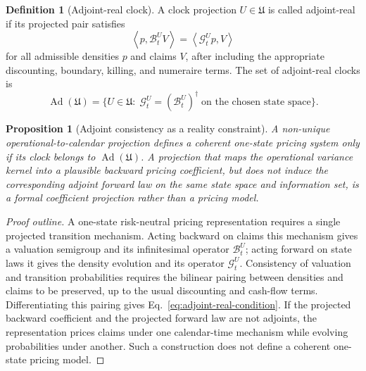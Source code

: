 \documentclass[11pt]{amsart}
\newcommand{\Ad}{\operatorname{Ad}}
\newcommand{\Pair}[2]{\left\langle #1,#2\right\rangle}
\newcommand{\Bop}{\mathcal{B}}
\newcommand{\Gop}{\mathcal{G}}
\theoremstyle{definition}
\newtheorem{definition}{Definition}
\theoremstyle{plain}
\newtheorem{proposition}{Proposition}
\theoremstyle{remark}
\begin{document}
\begin{definition}[Adjoint-real clock]
A clock projection $U\in\mathfrak U$ is called adjoint-real if its projected pair satisfies
\begin{equation}
 \Pair{p}{\Bop_t^U V}=\Pair{\Gop_t^U p}{V}
 \label{eq:adjoint-real-condition}
\end{equation}
for all admissible densities $p$ and claims $V$, after including the appropriate discounting, boundary, killing, and numeraire terms. The set of adjoint-real clocks is
\begin{equation}
 \Ad(\mathfrak U)=\{U\in\mathfrak U:\; \Gop_t^U=(\Bop_t^U)^\dagger\;\text{on the chosen state space}\}.
 \label{eq:Ad-set}
\end{equation}
\end{definition}

\begin{proposition}[Adjoint consistency as a reality constraint] \label{prop:adjoint-real}
A non-unique operational-to-calendar projection defines a coherent one-state pricing system only if its clock belongs to $\Ad(\mathfrak U)$. A projection that maps the operational variance kernel into a plausible backward pricing coefficient, but does not induce the corresponding adjoint forward law on the same state space and information set, is a formal coefficient projection rather than a pricing model.
\end{proposition}

\begin{proof}[Proof outline] \label{proof:adjoint-realoutline}
A one-state risk-neutral pricing representation requires a single projected transition mechanism. Acting backward on claims this mechanism gives a valuation semigroup and its infinitesimal operator $\Bop_t^U$; acting forward on state laws it gives the density evolution and its operator $\Gop_t^U$. Consistency of valuation and transition probabilities requires the bilinear pairing between densities and claims to be preserved, up to the usual discounting and cash-flow terms. Differentiating this pairing gives Eq.~\eqref{eq:adjoint-real-condition}. If the projected backward coefficient and the projected forward law are not adjoints, the representation prices claims under one calendar-time mechanism while evolving probabilities under another. Such a construction does not define a coherent one-state pricing model.
\end{proof}
\end{document}
